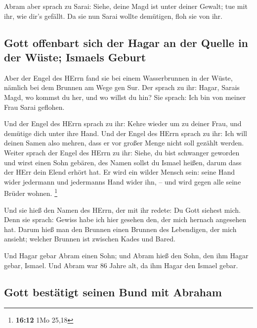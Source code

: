  Abram aber sprach zu Sarai: Siehe, deine Magd ist unter
deiner Gewalt; tue mit ihr, wie dir's gefällt. Da sie nun Sarai wollte
demütigen, floh sie von ihr.

\hypertarget{gott-offenbart-sich-der-hagar-an-der-quelle-in-der-wuxfcste-ismaels-geburt}{%
\subsection{Gott offenbart sich der Hagar an der Quelle in der Wüste;
Ismaels
Geburt}\label{gott-offenbart-sich-der-hagar-an-der-quelle-in-der-wuxfcste-ismaels-geburt}}

 Aber der Engel des HErrn fand sie bei einem Wasserbrunnen
in der Wüste, nämlich bei dem Brunnen am Wege gen Sur. 
Der sprach zu ihr: Hagar, Sarais Magd, wo kommst du her, und wo willst
du hin? Sie sprach: Ich bin von meiner Frau Sarai geflohen.

 Und der Engel des HErrn sprach zu ihr: Kehre wieder um zu
deiner Frau, und demütige dich unter ihre Hand.  Und der
Engel des HErrn sprach zu ihr: Ich will deinen Samen also mehren, dass
er vor großer Menge nicht soll gezählt werden.  Weiter
sprach der Engel des HErrn zu ihr: Siehe, du bist schwanger geworden und
wirst einen Sohn gebären, des Namen sollst du Ismael heißen, darum dass
der HErr dein Elend erhört hat.  Er wird ein wilder
Mensch sein: seine Hand wider jedermann und jedermanns Hand wider ihn,
-- und wird gegen alle seine Brüder wohnen. \footnote{\textbf{16:12} 1Mo
  25,18}

 Und sie hieß den Namen des HErrn, der mit ihr redete: Du
Gott siehest mich. Denn sie sprach: Gewiss habe ich hier gesehen den,
der mich hernach angesehen hat.  Darum hieß man den
Brunnen einen Brunnen des Lebendigen, der mich ansieht; welcher Brunnen
ist zwischen Kades und Bared.

 Und Hagar gebar Abram einen Sohn; und Abram hieß den
Sohn, den ihm Hagar gebar, Ismael.  Und Abram war 86
Jahre alt, da ihm Hagar den Ismael gebar.

\hypertarget{gott-bestuxe4tigt-seinen-bund-mit-abraham}{%
\subsection{Gott bestätigt seinen Bund mit
Abraham}\label{gott-bestuxe4tigt-seinen-bund-mit-abraham}}

